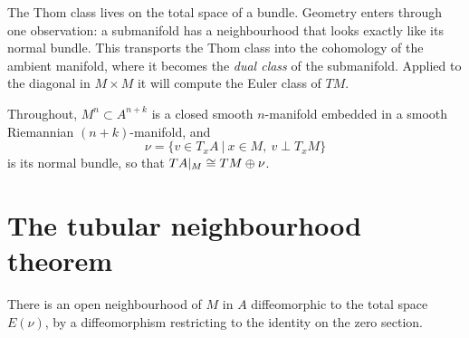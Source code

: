 \lecture

\begin{guiding}
The Thom class lives on the total space of a bundle. Geometry enters through one
observation: a submanifold has a neighbourhood that looks exactly like its
normal bundle. This transports the Thom class into the cohomology of the
ambient manifold, where it becomes the \emph{dual class} of the submanifold.
Applied to the diagonal in $M\times M$ it will compute the Euler class of $TM$.
\end{guiding}

Throughout, $M^n\subset A^{n+k}$ is a closed smooth $n$-manifold embedded in a
smooth Riemannian $(n+k)$-manifold, and
\[
\nu=\big\{v\in T_xA\ \big|\ x\in M,\ v\perp T_xM\big\}
\]
is its normal bundle, so that $TA|_M\cong TM\oplus\nu$.

\section{The tubular neighbourhood theorem}

\begin{theorem}\label{thm:tnt}
There is an open neighbourhood of $M$ in $A$ diffeomorphic to the total space
$E(\nu)$, by a diffeomorphism restricting to the identity on the zero section.
\end{theorem}

